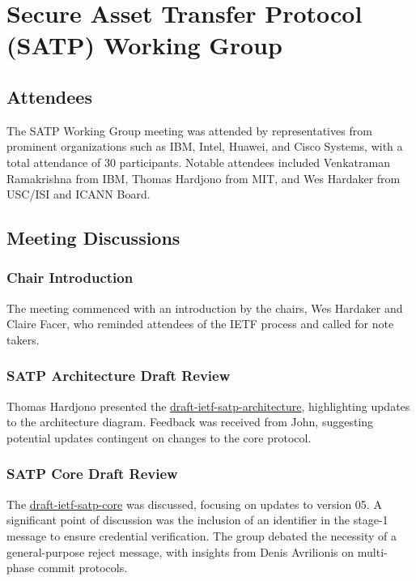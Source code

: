 \documentclass{article}
\begin{document}
\newpage

\section{Secure Asset Transfer Protocol (SATP) Working Group}

\subsection{Attendees}
The SATP Working Group meeting was attended by representatives from prominent organizations such as IBM, Intel, Huawei, and Cisco Systems, with a total attendance of 30 participants. Notable attendees included Venkatraman Ramakrishna from IBM, Thomas Hardjono from MIT, and Wes Hardaker from USC/ISI and ICANN Board.

\subsection{Meeting Discussions}

\subsubsection{Chair Introduction}
The meeting commenced with an introduction by the chairs, Wes Hardaker and Claire Facer, who reminded attendees of the IETF process and called for note takers.

\subsubsection{SATP Architecture Draft Review}
Thomas Hardjono presented the \href{https://datatracker.ietf.org/doc/html/draft-ietf-satp-architecture}{draft-ietf-satp-architecture}, highlighting updates to the architecture diagram. Feedback was received from John, suggesting potential updates contingent on changes to the core protocol.

\subsubsection{SATP Core Draft Review}
The \href{https://datatracker.ietf.org/doc/html/draft-ietf-satp-core}{draft-ietf-satp-core} was discussed, focusing on updates to version 05. A significant point of discussion was the inclusion of an identifier in the stage-1 message to ensure credential verification. The group debated the necessity of a general-purpose reject message, with insights from Denis Avrilionis on multi-phase commit protocols.
\end{document}
